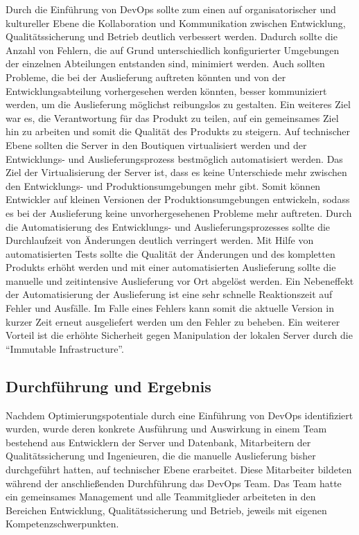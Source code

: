 Durch die Einführung von DevOps sollte zum einen auf organisatorischer und kultureller Ebene die Kollaboration und Kommunikation zwischen Entwicklung, Qualitätssicherung und Betrieb deutlich verbessert werden. 
Dadurch sollte die Anzahl von Fehlern, die auf Grund unterschiedlich konfigurierter Umgebungen der einzelnen Abteilungen entstanden sind, minimiert werden. 
Auch sollten Probleme, die bei der Auslieferung auftreten könnten und von der Entwicklungsabteilung vorhergesehen werden könnten, besser kommuniziert werden, um die Auslieferung möglichst reibungslos zu gestalten. 
Ein weiteres Ziel war es, die Verantwortung für das Produkt zu teilen, auf ein gemeinsames Ziel hin zu arbeiten und somit die Qualität des Produkts zu steigern. 
Auf technischer Ebene sollten die Server in den Boutiquen virtualisiert werden und der Entwicklungs- und Auslieferungsprozess bestmöglich automatisiert werden. 
Das Ziel der Virtualisierung der Server ist, dass es keine Unterschiede mehr zwischen den Entwicklungs- und Produktionsumgebungen mehr gibt. 
Somit können Entwickler auf kleinen Versionen der Produktionsumgebungen entwickeln, sodass es bei der Auslieferung keine unvorhergesehenen Probleme mehr auftreten. 
Durch die Automatisierung des Entwicklungs- und Auslieferungsprozesses sollte die Durchlaufzeit von Änderungen deutlich verringert werden. 
Mit Hilfe von automatisierten Tests sollte die Qualität der Änderungen und des kompletten Produkts erhöht werden und mit einer automatisierten Auslieferung sollte die manuelle und zeitintensive Auslieferung vor Ort abgelöst werden. 
Ein Nebeneffekt der Automatisierung der Auslieferung ist eine sehr schnelle Reaktionszeit auf Fehler und Ausfälle. 
Im Falle eines Fehlers kann somit die aktuelle Version in kurzer Zeit erneut ausgeliefert werden um den Fehler zu beheben. 
Ein weiterer Vorteil ist die erhöhte Sicherheit gegen Manipulation der lokalen Server durch die \enquote{Immutable Infrastructure}. 
\parencite[Vgl.][S. 5]{Reed:2014}

\subsection{Durchführung und Ergebnis}
Nachdem Optimierungspotentiale durch eine Einführung von DevOps identifiziert wurden, wurde deren konkrete Ausführung und Auswirkung in einem Team bestehend aus Entwicklern der Server und Datenbank, Mitarbeitern der Qualitätssicherung und Ingenieuren, die die manuelle Auslieferung bisher durchgeführt hatten, auf technischer Ebene erarbeitet.
Diese Mitarbeiter bildeten während der anschließenden Durchführung das DevOps Team. 
Das Team hatte ein gemeinsames Management und alle Teammitglieder arbeiteten in den Bereichen Entwicklung, Qualitätssicherung und Betrieb, jeweils mit eigenen Kompetenzschwerpunkten. 
\parencite[Vgl.][S. 4]{Reed:2014}

